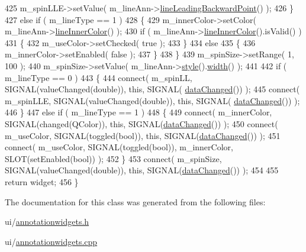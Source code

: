\begin{DoxyCode}
425         m\_spinLLE->setValue( m\_lineAnn->\hyperlink{classOkular_1_1LineAnnotation_a6a492d6aadd6d9ee879f85c5f24e99a0}{lineLeadingBackwardPoint}() );
426     \}
427     \textcolor{keywordflow}{else} \textcolor{keywordflow}{if} ( m\_lineType == 1 )
428     \{
429         m\_innerColor->setColor( m\_lineAnn->\hyperlink{classOkular_1_1LineAnnotation_a240bcd7154afdf61c526295134abdc0f}{lineInnerColor}() );
430         \textcolor{keywordflow}{if} ( m\_lineAnn->\hyperlink{classOkular_1_1LineAnnotation_a240bcd7154afdf61c526295134abdc0f}{lineInnerColor}().isValid() )
431         \{
432             m\_useColor->setChecked( \textcolor{keyword}{true} );
433         \}
434         \textcolor{keywordflow}{else}
435         \{
436             m\_innerColor->setEnabled( \textcolor{keyword}{false} );
437         \}
438     \}
439     m\_spinSize->setRange( 1, 100 );
440     m\_spinSize->setValue( m\_lineAnn->\hyperlink{classOkular_1_1Annotation_ae1f845ddbd6d524b2b388c6c9ef26423}{style}().\hyperlink{classOkular_1_1Annotation_1_1Style_a5a8e23f3a4f95e25f45770937dc82948}{width}() );
441 
442     \textcolor{keywordflow}{if} ( m\_lineType == 0 )
443     \{
444         connect( m\_spinLL, SIGNAL(valueChanged(\textcolor{keywordtype}{double})), \textcolor{keyword}{this}, SIGNAL(
      \hyperlink{classAnnotationWidget_af9dcb02a8b69a602225c9844b5deb6d4}{dataChanged}()) );
445         connect( m\_spinLLE, SIGNAL(valueChanged(\textcolor{keywordtype}{double})), \textcolor{keyword}{this}, SIGNAL(
      \hyperlink{classAnnotationWidget_af9dcb02a8b69a602225c9844b5deb6d4}{dataChanged}()) );
446     \}
447     \textcolor{keywordflow}{else} \textcolor{keywordflow}{if} ( m\_lineType == 1 )
448     \{
449         connect( m\_innerColor, SIGNAL(changed(QColor)), \textcolor{keyword}{this}, SIGNAL(\hyperlink{classAnnotationWidget_af9dcb02a8b69a602225c9844b5deb6d4}{dataChanged}()) );
450         connect( m\_useColor, SIGNAL(toggled(\textcolor{keywordtype}{bool})), \textcolor{keyword}{this}, SIGNAL(\hyperlink{classAnnotationWidget_af9dcb02a8b69a602225c9844b5deb6d4}{dataChanged}()) );
451         connect( m\_useColor, SIGNAL(toggled(\textcolor{keywordtype}{bool})), m\_innerColor, SLOT(setEnabled(\textcolor{keywordtype}{bool})) );
452     \}
453     connect( m\_spinSize, SIGNAL(valueChanged(\textcolor{keywordtype}{double})), \textcolor{keyword}{this}, SIGNAL(\hyperlink{classAnnotationWidget_af9dcb02a8b69a602225c9844b5deb6d4}{dataChanged}()) );
454 
455     \textcolor{keywordflow}{return} widget;
456 \}
\end{DoxyCode}


The documentation for this class was generated from the following files\+:\begin{DoxyCompactItemize}
\item 
ui/\hyperlink{annotationwidgets_8h}{annotationwidgets.\+h}\item 
ui/\hyperlink{annotationwidgets_8cpp}{annotationwidgets.\+cpp}\end{DoxyCompactItemize}
